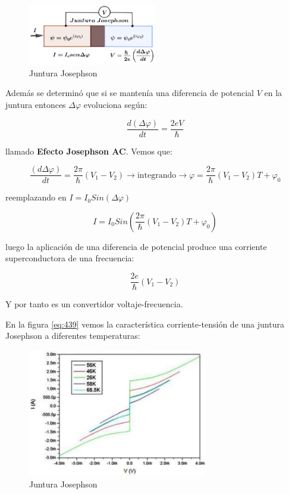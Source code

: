 \begin{figure}[H]
    \centering
    \includegraphics[width=0.5\textwidth]{./Figures/fig438}
	\caption{Juntura Josephson}
	\label{fig:438}
\end{figure}


Además se determinó que si se mantenía una diferencia de potencial $V$ en la juntura entonces $\Delta\varphi$ evoluciona según:

\begin{equation}
	\frac{d(\Delta\varphi)}{dt}= \frac{2eV}{\hbar}
\end{equation}

llamado \textbf{Efecto Josephson AC}. Vemos que:

\begin{equation}
	\frac{(d\Delta\varphi)}{dt} = \frac{2\pi}{\hbar}(V_{1}-V_{2})\rightarrow \text{integrando}\rightarrow \varphi=\frac{2\pi}{\hbar}(V_{1}-V_{2}) T + \varphi_{0}
\end{equation}

reemplazando en $I= I_{0}Sin(\Delta\varphi)$


\begin{equation}
	I=I_{0}Sin\left( \frac{2\pi}{\hbar}(V_{1}-V_{2}) T + \varphi_{0}\right) 
\end{equation}


luego la aplicación de una diferencia de potencial produce una corriente superconductora de una frecuencia:
 
\begin{equation}
	\frac{2e}{\hbar}(V_{1}-V_{2})
\end{equation}

Y por tanto es un convertidor voltaje-frecuencia.

En la figura \ref{eq:439} vemos la característica corriente-tensión de una juntura Josephson a diferentes temperaturas:

\begin{figure}[H]
    \centering
    \includegraphics[width=0.7\textwidth]{./Figures/fig439}
	\caption{Juntura Josephson}
	\label{fig:439}
\end{figure}


